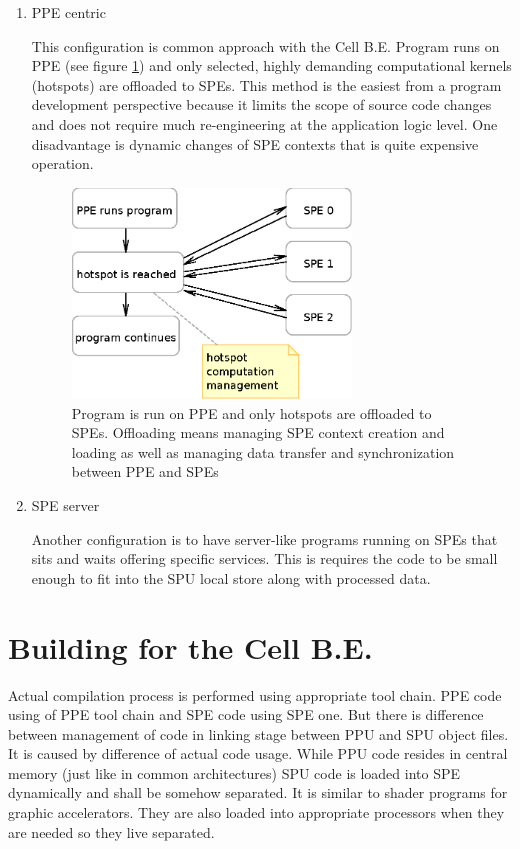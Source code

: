 \begin{enumerate}
\item PPE centric
\par
This configuration is common approach with the Cell B.E.
Program runs on PPE (see figure \ref{fg:PPUCentricModel}) and only selected, highly demanding computational kernels (hotspots) are offloaded to SPEs.
This method is the easiest from a program development perspective because it limits the scope of source code changes and does not require much re-engineering at the application logic level.
One disadvantage is dynamic changes of SPE contexts that is quite expensive operation.

\begin{figure}
    \centering
    \includegraphics[width=0.7\textwidth]{data/PPUCentricModel}
    \caption[PPE centric configuration]{Program is run on PPE and only hotspots are offloaded to SPEs.
 Offloading means managing SPE context creation and loading as well as managing data transfer and synchronization between PPE and SPEs}
    \label{fg:PPUCentricModel}
\end{figure}

\item SPE server
\par
Another configuration is to have server-like programs running on SPEs that sits and waits offering specific services.
This is requires the code to be small enough to fit into the SPU local store along with processed data.

\end{enumerate}

\section {Building for the Cell B.E.}
\par
Actual compilation process is performed using appropriate tool chain.
PPE code using of PPE tool chain and SPE code using SPE one.
But there is difference between management of code in linking stage between PPU and SPU object files.
It is caused by difference of actual code usage.
While PPU code resides in central memory (just like in common architectures) SPU code is loaded into SPE dynamically and shall be somehow separated.
It is similar to shader programs for graphic accelerators.
They are also loaded into appropriate processors when they are needed so they live separated.

